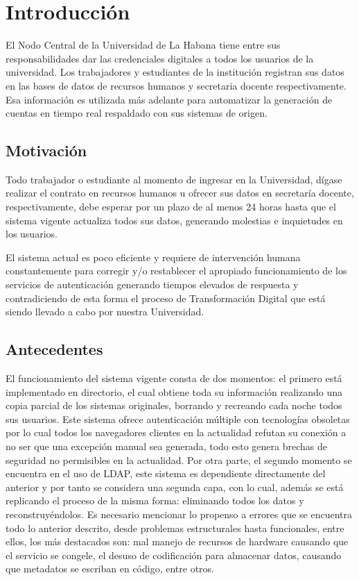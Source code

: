 \chapter*{Introducción}\label{chapter:introduction}
El Nodo Central de la Universidad de La Habana tiene entre sus responsabilidades dar  las credenciales  digitales a todos los usuarios de la universidad. Los trabajadores y estudiantes de la instituci\'on registran sus datos en las bases de datos de recursos humanos y secretaria docente respectivamente. Esa informaci\'on  es utilizada m\'as adelante para automatizar la generación de cuentas en tiempo real respaldado con sus sistemas de origen.


\section*{Motivación}
Todo trabajador o estudiante al momento de ingresar en la Universidad, dígase realizar el contrato en recursos humanos u ofrecer sus datos en secretaría docente, respectivamente, debe esperar por un plazo de al menos 24 horas hasta que el sistema vigente actualiza todos sus datos, generando molestias e inquietudes en los usuarios.

El sistema actual es poco eficiente y requiere de intervención humana constantemente para corregir y/o restablecer el apropiado funcionamiento de los servicios de autenticación generando tiempos elevados de respuesta y contradiciendo de esta forma el proceso de Transformación Digital que está siendo llevado a cabo por nuestra Universidad.

\section*{Antecedentes}
El funcionamiento del sistema vigente consta de dos momentos: el primero está implementado en directorio, el cual obtiene toda su información realizando una copia parcial de los sistemas originales, borrando y recreando cada noche todos sus usuarios. Este sistema ofrece autenticación múltiple con tecnologías obsoletas por lo cual todos los navegadores clientes en la actualidad refutan su conexión a no ser que una excepción manual sea generada, todo esto genera brechas de seguridad no permisibles en la actualidad. Por otra parte, el segundo momento se encuentra en el uso de LDAP, este sistema es dependiente directamente del anterior y por tanto se considera una segunda capa, con lo cual, además se está replicando el proceso de la misma forma: eliminando todos los datos y reconstruyéndolos. Es necesario mencionar lo propenso a errores que se encuentra todo lo anterior descrito, desde problemas estructurales hasta funcionales, entre ellos, los más destacados son: mal manejo de recursos de hardware causando que el servicio se congele, el desuso de codificación para almacenar datos, causando que metadatos se escriban en código, entre otros.
